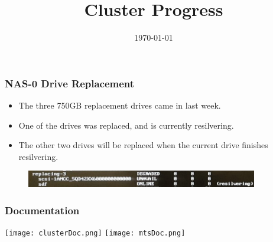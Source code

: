 \documentclass{beamer}
\title{Cluster Progress}
\date{\today}
\begin{document}

\begin{frame}
  \maketitle
\end{frame}



\begin{frame}
  \frametitle{NAS-0 Drive Replacement}

  \begin{itemize}
    
  \item The three 750GB replacement drives came in last week.
  \item One of the drives was replaced, and is currently resilvering. 
  \item The other two drives will be replaced when the current drive finishes resilvering. 

  \end{itemize}

  \begin{figure}[H]
    \begin{center}
      \includegraphics[width=0.9\textwidth]{nas0_drive_replacement_20190415.jpg}
    \end{center}
  \end{figure}

\end{frame}



\begin{frame}

  \frametitle{Documentation}

  \begin{center}
    \texttt{[image: clusterDoc.png]}
    \vspace{2cm}
    \texttt{[image: mtsDoc.png]}
  \end{center}

\end{frame}

\end{document}
